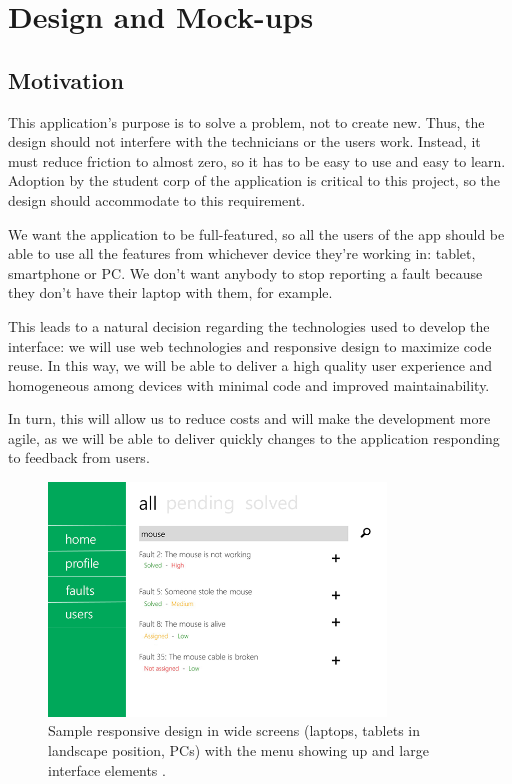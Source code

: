 \documentclass{report}
\begin{document}



\chapter{Design and Mock-ups}
\label{chapDesign}

\section{Motivation}

This application's purpose is to solve a problem, not to create new. Thus, the design should not interfere with the technicians or the users work. Instead, it must reduce friction to almost zero, so it has to be easy to use and easy to learn. Adoption by the student corp of the application is critical to this project, so the design should accommodate to this requirement.

We want the application to be full-featured, so all the users of the app should be able to use all the features from whichever device they're working in: tablet, smartphone or PC. We don't want anybody to stop reporting a fault because they don't have their laptop with them, for example.

This leads to a natural decision regarding the technologies used to develop the interface: we will use web technologies and responsive design to maximize code reuse. In this way, we will be able to deliver a high quality user experience and homogeneous among devices with minimal code and improved maintainability.

In turn, this will allow us to reduce costs and will make the development more agile, as we will be able to deliver quickly changes to the application responding to feedback from users.


\begin{figure}[hbtp]
\centering
\includegraphics[width=0.8\textwidth]{img/WideScreens.png}
\caption{Sample responsive design in wide screens (laptops, tablets in landscape position, PCs) with the menu showing up and large interface elements .}
\label{imgWideScreens}
\end{figure}
\end{document}
